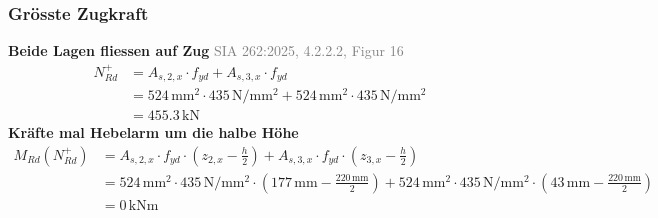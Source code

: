 \documentclass[11pt,a4paper]{article}
\newcommand{\normref}[1]{{\small\textcolor{gray}{#1}}}
\begin{document}
\subsubsection{Grösste Zugkraft}
\noindent\textbf{Beide Lagen fliessen auf Zug} \hfill \normref{SIA 262:2025, 4.2.2.2, Figur 16}
\begin{equation*}
\begin{aligned}
  N_{Rd}^{+} &= A_{s,2,x} \cdot f_{yd} + A_{s,3,x} \cdot f_{yd} \\
  &= 524\,\mathrm{mm}^{2} \cdot 435\,\mathrm{N}/\mathrm{mm}^{2} + 524\,\mathrm{mm}^{2} \cdot 435\,\mathrm{N}/\mathrm{mm}^{2} \\
  &= 455.3\,\mathrm{kN}
\end{aligned}
\end{equation*}
\noindent\textbf{Kräfte mal Hebelarm um die halbe Höhe}
\begin{equation*}
\begin{aligned}
  M_{Rd}(N_{Rd}^{+}) &= A_{s,2,x} \cdot f_{yd} \cdot \left(z_{2,x} - \tfrac{h}{2}\right) + A_{s,3,x} \cdot f_{yd} \cdot \left(z_{3,x} - \tfrac{h}{2}\right) \\
  &= 524\,\mathrm{mm}^{2} \cdot 435\,\mathrm{N}/\mathrm{mm}^{2} \cdot \left(177\,\mathrm{mm} - \tfrac{220\,\mathrm{mm}}{2}\right) + 524\,\mathrm{mm}^{2} \cdot 435\,\mathrm{N}/\mathrm{mm}^{2} \cdot \left(43\,\mathrm{mm} - \tfrac{220\,\mathrm{mm}}{2}\right) \\
  &= 0\,\mathrm{kNm}
\end{aligned}
\end{equation*}
\end{document}
